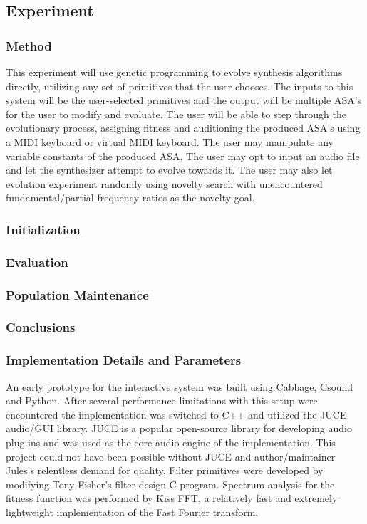 \documentclass[12pt]{article}
\begin{document}
\subsection{Experiment}
\subsubsection{Method}\label{IGAMETHOD}
This experiment will use genetic programming to evolve synthesis algorithms directly, utilizing any set of primitives that the user chooses. The inputs to this system will be the user-selected primitives and the output will be multiple ASA's for the user to modify and evaluate. The user will be able to step through the evolutionary process, assigning fitness and auditioning the produced ASA's using a MIDI keyboard or virtual MIDI keyboard. The user may manipulate any variable constants of the produced ASA. The user may opt to input an audio file and let the synthesizer attempt to evolve towards it. The user may also let evolution experiment randomly using novelty search with unencountered fundamental/partial frequency ratios as the novelty goal.
\subsubsection{Initialization}\label{IGAINIT}
\subsubsection{Evaluation}\label{IGAINIT}
\subsubsection{Population Maintenance}\label{IGAMAINTENANCE}
\subsubsection{Conclusions}\label{IGACONCLUSIONS}
\subsubsection{Implementation Details and Parameters}\label{IGAIMPLEMENTATION}

An early prototype for the interactive system was built using Cabbage, Csound and Python. After several performance limitations with this setup were encountered the implementation was switched to C++ and utilized the JUCE audio/GUI library. JUCE is a popular open-source library for developing audio plug-ins and was used as the core audio engine of the implementation. This project could not have been possible without JUCE and author/maintainer Jules's relentless demand for quality. Filter primitives were developed by modifying Tony Fisher's filter design C program. Spectrum analysis for the fitness function was performed by Kiss FFT, a relatively fast and extremely lightweight implementation of the Fast Fourier transform.
\end{document}
